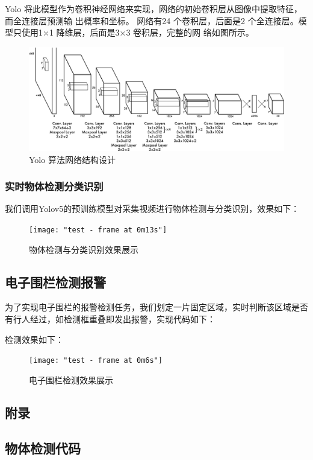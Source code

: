 \begin{enumerate}
	Yolo 将此模型作为卷积神经网络来实现，网络的初始卷积层从图像中提取特征，而全连接层预测输
	出概率和坐标。
	网络有24 个卷积层，后面是2 个全连接层。模型只使用1×1 降维层，后面是3×3 卷积层，完整的网
	络如图所示。
	
	\begin{figure}[H]
		\centering
		\includegraphics[width=0.7\linewidth]{screenshot012}
		\caption{Yolo 算法网络结构设计}
		\label{fig:screenshot012}
	\end{figure}
\end{enumerate}

\subsubsection{实时物体检测分类识别}
我们调用Yolov5的预训练模型对采集视频进行物体检测与分类识别，效果如下：
\begin{figure}[H]
	\centering
	\texttt{[image: "test - frame at 0m13s"]}
	\caption{物体检测与分类识别效果展示}
	\label{fig:test---frame-at-0m13s}
\end{figure}


\subsection{电子围栏检测报警}
为了实现电子围栏的报警检测任务，我们划定一片固定区域，实时判断该区域是否有行人经过，如检测框重叠即发出报警，实现代码如下：

检测效果如下：
\begin{figure}[H]
	\centering
	\texttt{[image: "test - frame at 0m6s"]}
	\caption{电子围栏检测效果展示}
	\label{fig:test---frame-at-0m6s}
\end{figure}

\newpage
\begin{appendices}
\section{附录}
\subsection{物体检测代码}



\end{appendices}
%


